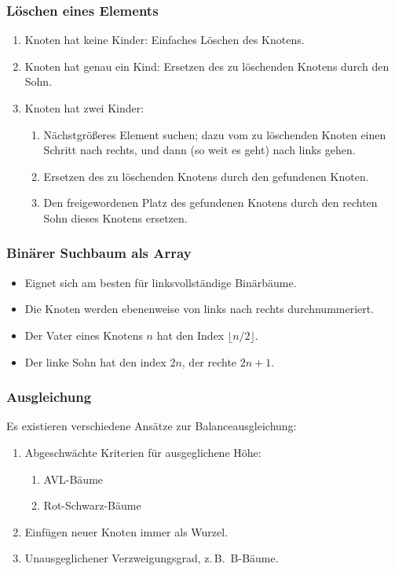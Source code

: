 \subsubsection{Löschen eines Elements}
\begin{enumerate}
  \item Knoten hat keine Kinder: Einfaches Löschen des Knotens.
  \item Knoten hat genau ein Kind: Ersetzen des zu löschenden Knotens durch den Sohn.
  \item Knoten hat zwei Kinder:
  \begin{enumerate}
    \item Nächstgrößeres Element suchen; dazu vom zu löschenden Knoten einen Schritt nach rechts, und dann (so weit es geht) nach links gehen.
    \item Ersetzen des zu löschenden Knotens durch den gefundenen Knoten.
    \item Den freigewordenen Platz des gefundenen Knotens durch den rechten Sohn dieses Knotens ersetzen.
  \end{enumerate}
\end{enumerate}

\subsubsection{Binärer Suchbaum als Array}
\begin{itemize}
  \item Eignet sich am besten für linksvollständige Binärbäume.
  \item Die Knoten werden ebenenweise von links nach rechts durchnummeriert.
  \item Der Vater eines Knotens $n$ hat den Index $\lfloor n/2 \rfloor$.
  \item Der linke Sohn hat den index $2n$, der rechte $2n+1$.
\end{itemize}

\subsubsection{Ausgleichung}
Es existieren verschiedene Ansätze zur Balanceausgleichung:
\begin{enumerate}
  \item Abgeschwächte Kriterien für ausgeglichene Höhe:
  \begin{enumerate}
    \item AVL-Bäume
    \item Rot-Schwarz-Bäume
  \end{enumerate}
  \item Einfügen neuer Knoten immer als Wurzel.
  \item Unausgeglichener Verzweigungsgrad, z.\,B.~B-Bäume.
\end{enumerate}


